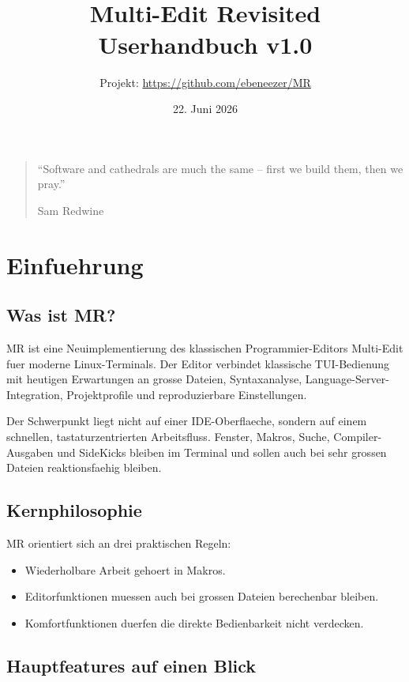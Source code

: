 \documentclass[a4paper,11pt]{report}
\title{\mr\\Multi-Edit Revisited\\Userhandbuch v1.0}
\author{Projekt: \url{https://github.com/ebeneezer/MR}}
\date{22. Juni 2026}
\newcommand{\mr}{\textsc{MR}}
\begin{document}
\maketitle

\begin{quote}
``Software and cathedrals are much the same -- first we build them, then we pray.''

\hfill Sam Redwine
\end{quote}

\tableofcontents
\listoftables

\chapter{Einfuehrung}

\section{Was ist MR?}

\mr{} ist eine Neuimplementierung des klassischen Programmier-Editors
Multi-Edit fuer moderne Linux-Terminals. Der Editor verbindet klassische
TUI-Bedienung mit heutigen Erwartungen an grosse Dateien, Syntaxanalyse,
Language-Server-Integration, Projektprofile und reproduzierbare
Einstellungen.

Der Schwerpunkt liegt nicht auf einer IDE-Oberflaeche, sondern auf einem
schnellen, tastaturzentrierten Arbeitsfluss. Fenster, Makros, Suche,
Compiler-Ausgaben und SideKicks bleiben im Terminal und sollen auch bei sehr
grossen Dateien reaktionsfaehig bleiben.

\section{Kernphilosophie}

\mr{} orientiert sich an drei praktischen Regeln:

\begin{itemize}
\item Wiederholbare Arbeit gehoert in Makros.
\item Editorfunktionen muessen auch bei grossen Dateien berechenbar bleiben.
\item Komfortfunktionen duerfen die direkte Bedienbarkeit nicht verdecken.
\end{itemize}

\section{Hauptfeatures auf einen Blick}
\end{document}
